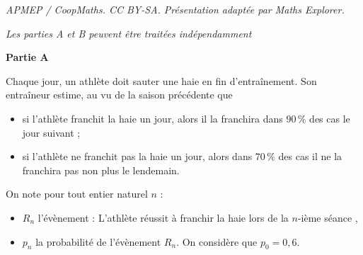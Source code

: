 \documentclass[10pt]{article}
\begin{document}
\noindent\textit{APMEP / CoopMaths. CC BY-SA. Présentation adaptée par Maths Explorer.}\par\medskip
\medskip

\emph{Les parties {\rm A} et {\rm B} peuvent être traitées indépendamment}

\medskip

\textbf{Partie A}

\medskip
Chaque jour, un athlète doit sauter une  haie en fin d'entraînement. Son entraîneur estime, au vu de la saison précédente que

\begin{itemize}
\item[$\bullet~~$]si l'athlète franchit la haie un jour,  alors il la franchira dans $90\,\%$ des cas le jour suivant ;
\item[$\bullet~~$]si l'athlète ne franchit pas la haie un jour, alors dans $70\,\%$ des cas il ne la franchira pas non plus le lendemain.
\end{itemize}

On note pour tout entier naturel $n$ :

\begin{itemize}
\item[$\bullet~~$]$R_n$ l'évènement : \og L'athlète réussit à franchir la haie lors de la $n$-ième séance \fg,
\item[$\bullet~~$]$p_n$ la probabilité de l'évènement $R_n$. On considère que $p_0 = 0,6$.
\end{itemize}

\medskip
\end{document}
